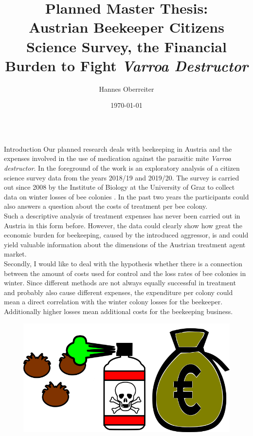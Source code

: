 \documentclass{beamer}
\title{Planned Master Thesis: \\[1ex] Austrian Beekeeper Citizens Science Survey, the Financial Burden to Fight \textit{Varroa Destructor}}
\author[\faEnvelope{} hoberreiter@gmail.com \faTwitter{} @btree\_hannes]{Hannes Oberreiter}
\institute
{University Graz, Institut of Biology}
\date{\today}
\begin{document}
\begin{frame}{} 

\begin{columns}[t]
  \begin{column}{0.49\textwidth}

    \begin{block}{Introduction}
      Our planned research deals with beekeeping in Austria and the expenses involved in the use of medication against the parasitic mite \textit{Varroa destructor}. In the foreground of the work is an exploratory analysis of a citizen science survey data from the years 2018/19 and 2019/20. The survey is carried out since 2008 by the Institute of Biology at the University of Graz to collect data on winter losses of bee colonies \citep{brodschneider2013}. In the past two years the participants could also answers a question about the costs of treatment per bee colony. \\
      Such a descriptive analysis of treatment expenses has never been carried out in Austria in this form before. However, the data could clearly show how great the economic burden for beekeeping, caused by the introduced aggressor, is and could yield valuable information about the dimensions of the Austrian treatment agent market. \\
      Secondly, I would like to deal with the hypothesis whether there is a connection between the amount of costs used for control and the loss rates of bee colonies in winter. Since different methods are not always equally successful in treatment \citep{brodschneider2013, crailsheim2018, oberreiter2020} and probably also cause different expenses, the expenditure per colony could mean a direct correlation with the winter colony losses for the beekeeper. Additionally higher losses mean additional costs for the beekeeping business.
      \begin{figure}
      \centering
      \includegraphics[width=.7\textwidth]{img/drawing.png}
      \end{figure}
    \end{block}


\end{column}
\end{columns}
\end{frame}
\end{document}

